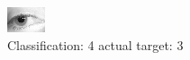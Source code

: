 \begin{figure}[h!]
\begin{center}
\includegraphics[width=0.60\columnwidth]{figures/ID1404_class_4_target_3.png}
\end{center}
\caption{ Classification: 4 actual target: 3}
\label{fig:ID1404_class_4_target_3}
\end{figure}
